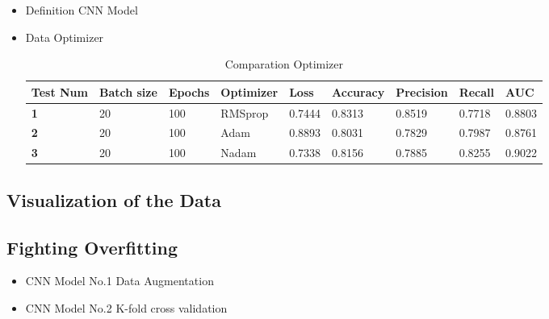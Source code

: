 \documentclass{book}
\begin{document}
            \begin{itemize}
                \item Definition CNN Model
                \item Data Optimizer
                
                \begin{table}
                    \begin{center}
                        \begin{tabular}{m{1.8cm}m{1.8cm}m{1cm}m{1.5cm}m{1cm}m{1.3cm}m{1.3cm}m{1cm}m{1cm}}
                            \midrule
                            \textbf{Test Num} & \textbf{Batch size} &	\textbf{Epochs}	& \textbf{Optimizer} &	\textbf{Loss}	& \textbf{Accuracy} &	\textbf{Precision}	& \textbf{Recall}	& \textbf{AUC} \\
                            \midrule
                            \textbf{1} & 20 &	100	& RMSprop & 0.7444	& 0.8313	& 0.8519	& 0.7718	& 0.8803 \\
                            \midrule
                            \textbf{2} & 20 &	100	& Adam & 0.8893	& 0.8031	& 0.7829	& 0.7987	& 0.8761 \\
                            \midrule
                            \textbf{3} & 20 &	100	& Nadam & 0.7338	& 0.8156	& 0.7885	& 0.8255	& 0.9022 \\
                            \midrule
                        \end{tabular}
                    \end{center}
                    \caption{\label{tab:optimizer}Comparation Optimizer}
                \end{table}
            \end{itemize}

            \subsection{Visualization of the Data}
            \subsection{Fighting Overfitting}

            \begin{itemize}
                \item CNN Model No.1 Data Augmentation
                \item CNN Model No.2 K-fold cross validation
            \end{itemize}
\end{document}
